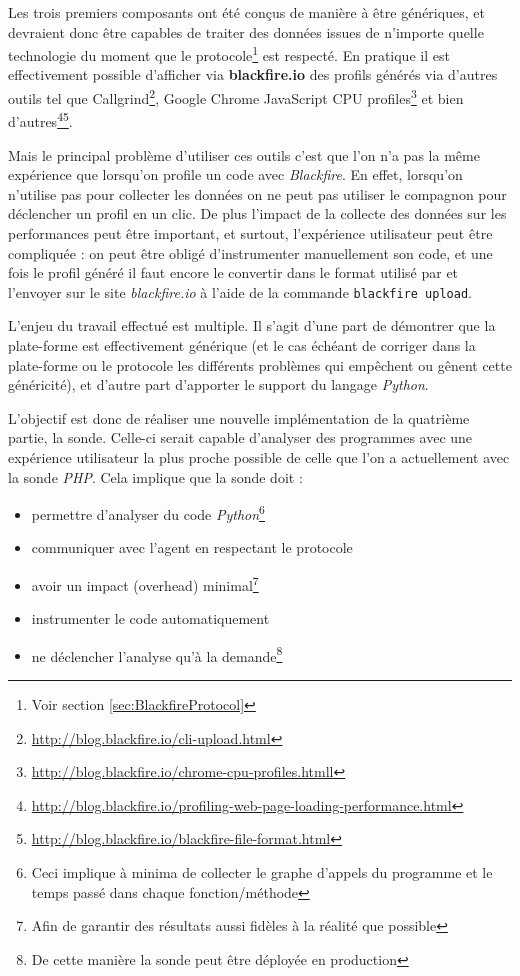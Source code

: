 Les trois premiers composants ont été conçus de manière à être génériques, et devraient donc être capables de traiter des données issues de n'importe quelle technologie du moment que le protocole\footnote{Voir section \vref{sec:BlackfireProtocol}} est respecté. En pratique il est effectivement possible d'afficher via \textbf{blackfire.io} des profils générés via d'autres outils tel que Callgrind\footnote{\url{http://blog.blackfire.io/cli-upload.html}}, Google Chrome JavaScript CPU profiles\footnote{\url{http://blog.blackfire.io/chrome-cpu-profiles.htmll}} et bien d'autres\footnote{\url{http://blog.blackfire.io/profiling-web-page-loading-performance.html}}\footnote{\url{http://blog.blackfire.io/blackfire-file-format.html}}.

Mais le principal problème d'utiliser ces outils c'est que l'on n'a pas la même expérience que lorsqu'on profile un code \PHP avec \emph{Blackfire}. En effet, lorsqu'on n'utilise pas \Blackfire pour collecter les données on ne peut pas utiliser le compagnon pour déclencher un profil en un clic. De plus l'impact de la collecte des données sur les performances peut être important, et surtout, l'expérience utilisateur peut être compliquée : on peut être obligé d'instrumenter manuellement son code, et une fois le profil généré il faut encore le convertir dans le format utilisé par \Blackfire et l'envoyer sur le site \emph{blackfire.io} à l'aide de la commande \verb|blackfire upload|.

L'enjeu du travail effectué est multiple. Il s'agit d'une part de démontrer que la plate-forme \Blackfire est effectivement générique (et le cas échéant de corriger dans la plate-forme ou le protocole les différents problèmes qui empêchent ou gênent cette généricité), et d'autre part d'apporter le support du langage \emph{Python}.

L'objectif est donc de réaliser une nouvelle implémentation de la quatrième partie, la sonde. Celle-ci serait capable d'analyser des programmes \Python avec une expérience utilisateur la plus proche possible de celle que l'on a actuellement avec la sonde \emph{PHP}. Cela implique que la sonde doit :
\begin{itemize}
  \item permettre d'analyser du code \emph{Python}\footnote{Ceci implique à minima de collecter le graphe d'appels du programme et le temps passé dans chaque fonction/méthode}
  \item communiquer avec l'agent en respectant le protocole
  \item avoir un impact (\gls{overhead}) minimal\footnote{Afin de garantir des résultats aussi fidèles à la réalité que possible}
  \item instrumenter le code automatiquement
  \item ne déclencher l'analyse qu'à la demande\footnote{De cette manière la sonde peut être déployée en production}
\end{itemize}

\setcounter{part}{0}
\setcounter{chapter}{0} 